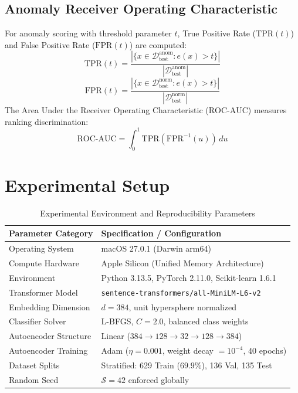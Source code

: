 \documentclass[conference]{IEEEtran}
\begin{document}
\subsection{Anomaly Receiver Operating Characteristic}
For anomaly scoring with threshold parameter $t$, True Positive Rate ($\text{TPR}(t)$) and False Positive Rate ($\text{FPR}(t)$) are computed:
\begin{equation}
\text{TPR}(t) = \frac{|\{x \in \mathcal{D}_{\text{test}}^{\text{anom}} : e(x) > t\}|}{|\mathcal{D}_{\text{test}}^{\text{anom}}|}
\end{equation}
\begin{equation}
\text{FPR}(t) = \frac{|\{x \in \mathcal{D}_{\text{test}}^{\text{norm}} : e(x) > t\}|}{|\mathcal{D}_{\text{test}}^{\text{norm}}|}
\end{equation}
The Area Under the Receiver Operating Characteristic ($\text{ROC-AUC}$) measures ranking discrimination:
\begin{equation}
\text{ROC-AUC} = \int_0^1 \text{TPR}(\text{FPR}^{-1}(u)) \, du
\end{equation}

\section{Experimental Setup}

\begin{table}[h]
\centering
\caption{Experimental Environment and Reproducibility Parameters}
\label{tab:env}
\begin{tabular}{ll}
\toprule
\textbf{Parameter Category} & \textbf{Specification / Configuration} \\
\midrule
Operating System & macOS 27.0.1 (Darwin arm64) \\
Compute Hardware & Apple Silicon (Unified Memory Architecture) \\
Environment & Python 3.13.5, PyTorch 2.11.0, Scikit-learn 1.6.1 \\
Transformer Model & \texttt{sentence-transformers/all-MiniLM-L6-v2} \\
Embedding Dimension & $d=384$, unit hypersphere normalized \\
Classifier Solver & L-BFGS, $C=2.0$, balanced class weights \\
Autoencoder Structure & Linear ($384 \to 128 \to 32 \to 128 \to 384$) \\
Autoencoder Training & Adam ($\eta = 0.001$, weight decay $= 10^{-4}$, 40 epochs) \\
Dataset Splits & Stratified: 629 Train ($69.9\%$), 136 Val, 135 Test \\
Random Seed & $\mathcal{S} = 42$ enforced globally \\
\bottomrule
\end{tabular}
\end{table}
\end{document}
